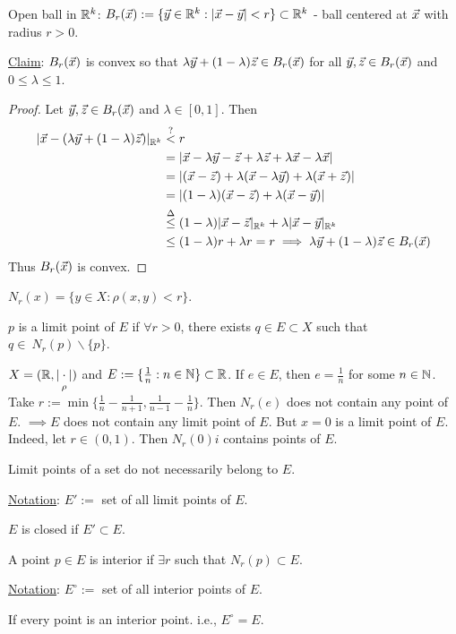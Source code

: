 \documentclass[]{article}
\begin{document}
\begin{example}
	Open ball in $\mathbb{R}^k$: $B_r(\vec{x}) := \{ \vec{y}\in\mathbb{R}^k : |\vec{x}-\vec{y}|<r \}\subset \mathbb{R}^k$ - ball centered at $\vec{x}$ with radius $r>0$.
	
	\ul{Claim}: $B_r(\vec{x})$ is convex so that $\lambda\vec{y} + (1-\lambda)\vec{z}\in B_r(\vec{x})$ for all $\vec{y},\vec{z}\in B_r(\vec{x})$ and $0\leq \lambda\leq 1$.
	\begin{proof}
		Let $\vec{y},\vec{z}\in B_r(\vec{x})$ and $\lambda\in[0,1]$. Then
		\begin{align*}
			|\vec{x} -(\lambda\vec{y} + (1-\lambda)\vec{z})|_{\mathbb{R}^k} &\overset{?}{<} r \\
			&= | \vec{x} - \lambda\vec{y} - \vec{z} + \lambda\vec{z} +\lambda\vec{x} - \lambda\vec{x}| \\
		 	&= |(\vec{x} - \vec{z}) + \lambda(\vec{x} -\lambda\vec{y}) +\lambda(\vec{x} +\vec{z})| \\
			&= |(1-\lambda)(\vec{x}-\vec{z}) + \lambda(\vec{x}-\vec{y})| \\
			&\overset{\Delta}{\leq} (1-\lambda)|\vec{x}-\vec{z}|_{\mathbb{R}^k} + \lambda|\vec{x}-\vec{y}|_{\mathbb{R}^k} \\
			&\leq (1-\lambda)r + \lambda r = r \implies \lambda\vec{y} + (1-\lambda)\vec{z}\in B_r(\vec{x})
		\end{align*}
		Thus $B_r(\vec{x})$ is convex.
	\end{proof}
\end{example}

\begin{definition}
	[Neighborhood] $N_r(x) = \{y\in X: \rho(x,y)<r\}$.
\end{definition}
\begin{definition}
	 $p$ is a limit point of $E$ if $\forall r>0$, there exists $q\in E\subset X$ such that $q\in~N_r(p)\backslash\{p\}$.
\end{definition}
\begin{example}
	$X = (\mathbb{R},\underset{\rho}{|\cdot|})$ and $E:= \{\frac{1}{n}:n\in\mathbb{N}\}\subset\mathbb{R}$.
	If $e\in E$, then $e = \frac{1}{n}$ for some $n\in\mathbb{N}$.
	Take $r:= \min\{\frac{1}{n}-\frac{1}{n+1},\frac{1}{n-1}-\frac{1}{n}\}$.
	Then $N_r(e)$ does not contain any point of $E$. $\implies E$ does not contain any limit point of $E$.
	But $x=0$ is a limit point of $E$. Indeed, let $r\in(0,1)$. Then $N_r(0)i$ contains points of $E$.
\end{example}
\begin{remark}
	Limit points of a set do not necessarily belong to $E$.
\end{remark}
\ul{Notation}: $E':=$ set of all limit points of $E$.
\begin{definition}
	 $E$ is closed if $E'\subset E$.
\end{definition}
\begin{definition}
	 A point $p\in E$ is interior if $\exists r$ such that $N_r(p)\subset E$.
\end{definition}
\ul{Notation}: $E^\circ := $ set of all interior points of $E$.
\begin{definition}
	 If every point is an interior point. i.e., $E^\circ = E$.
\end{definition}
\end{document}
